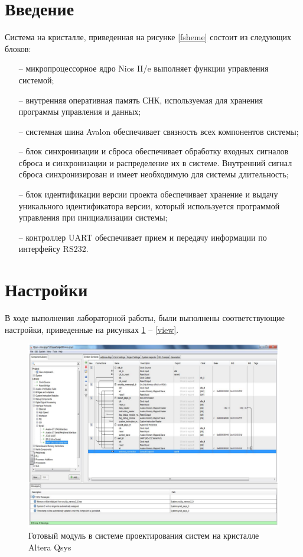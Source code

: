 \documentclass{article}
\begin{document}
\section{Введение}
Система на кристалле, приведенная на рисунке \ref{fsheme} состоит из следующих блоков:
\begin{itemize}
	\item[--] микропроцессорное ядро Nios II/e выполняет функции управления системой;
	\item[--] внутренняя оперативная память СНК, используемая для хранения программы управления и данных;
	\item[--] системная шина Avalon обеспечивает связность всех компонентов системы;
	\item[--] блок синхронизации и сброса обеспечивает обработку входных сигналов сброса и синхронизации и 
распределение их в системе. Внутренний сигнал сброса синхронизирован и имеет необходимую для системы 
длительность;
	\item[--] блок идентификации версии проекта обеспечивает хранение и выдачу уникального идентификатора 
версии, который используется программой управления при инициализации системы;
	\item[--] контроллер UART обеспечивает прием и передачу информации по интерфейсу RS232.
\end{itemize}

\clearpage\section{Настройки}
В ходе выполнения лабораторной работы, были выполнены соответствующие настройки, приведенные на рисунках
\ref{qsys} -- \ref{view}.

\begin{figure}[h]
	\centering
	\includegraphics[scale=0.7]{tools/qsys.png}
	\caption{Готовый модуль в системе проектирования систем на кристалле Altera Qsys}
	\label{qsys}
\end{figure}
\end{document}
